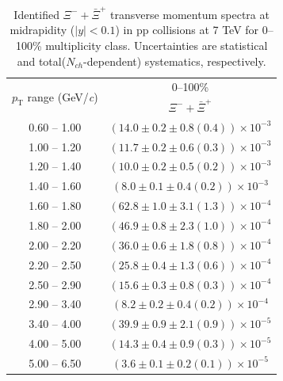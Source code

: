 \clearpage
\begin{table}
\caption{Identified $\Xi^{-} + \bar{\Xi}^{+}$ transverse momentum spectra at midrapidity ($|y|<0.1$) in pp collisions at 7 TeV for 0--100\% multiplicity class. Uncertainties are statistical and total($N_{ch}$-dependent) systematics, respectively.}
\label{tab:XiSum_0to100}
\begin{center}
\begin{tabular}{ c | c }
\hline
\multirow{2}{*}{$p_{\mathrm{T}}$ range (GeV/\textit{c})} & \multicolumn{1}{c}{0--100\%} \\ & $\Xi^{-} + \bar{\Xi}^{+}$\\ 
\hline
0.60 -- 1.00 & $(14.0\pm0.2\pm0.8(0.4))\times10^{-3}$ \\ 
1.00 -- 1.20 & $(11.7\pm0.2\pm0.6(0.3))\times10^{-3}$ \\ 
1.20 -- 1.40 & $(10.0\pm0.2\pm0.5(0.2))\times10^{-3}$ \\ 
1.40 -- 1.60 & $(8.0\pm0.1\pm0.4(0.2))\times10^{-3}$ \\ 
1.60 -- 1.80 & $(62.8\pm1.0\pm3.1(1.3))\times10^{-4}$ \\ 
1.80 -- 2.00 & $(46.9\pm0.8\pm2.3(1.0))\times10^{-4}$ \\ 
2.00 -- 2.20 & $(36.0\pm0.6\pm1.8(0.8))\times10^{-4}$ \\ 
2.20 -- 2.50 & $(25.8\pm0.4\pm1.3(0.6))\times10^{-4}$ \\ 
2.50 -- 2.90 & $(15.6\pm0.3\pm0.8(0.3))\times10^{-4}$ \\ 
2.90 -- 3.40 & $(8.2\pm0.2\pm0.4(0.2))\times10^{-4}$ \\ 
3.40 -- 4.00 & $(39.9\pm0.9\pm2.1(0.9))\times10^{-5}$ \\ 
4.00 -- 5.00 & $(14.3\pm0.4\pm0.9(0.3))\times10^{-5}$ \\ 
5.00 -- 6.50 & $(3.6\pm0.1\pm0.2(0.1))\times10^{-5}$ \\ 
\hline
\end{tabular}
\end{center}
\end{table}
 
